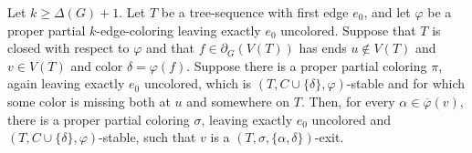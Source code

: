 \begin{lemma}
Let $k\geq\Delta(G)+1$.  Let $T$ be a tree-sequence with first edge $e_0$,
and let $\varphi$ be a proper partial $k$-edge-coloring leaving exactly
$e_0$ uncolored.  Suppose that $T$ is closed with respect to $\varphi$ and
that $f\in\partial_G(V(T))$ has ends $u\notin V(T)$ and $v\in V(T)$ and
color $\delta=\varphi(f)$.  Suppose there is a proper partial coloring
$\pi$, again leaving exactly $e_0$ uncolored, which is
$(T,C\cup\{\delta\},\varphi)$-stable and for which some color is missing
both at $u$ and somewhere on $T$.  Then, for every
$\alpha\in\overline\varphi(v)$, there is a proper partial coloring
$\sigma$, leaving exactly $e_0$ uncolored and
$(T,C\cup\{\delta\},\varphi)$-stable, such that $v$ is a
$(T,\sigma,\{\alpha,\delta\})$-exit.
\end{lemma}

